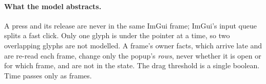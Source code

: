 \documentclass[a4paper,10pt,fleqn]{article}
\begin{document}
\paragraph{What the model abstracts.}
A press and its release are never in the same ImGui frame; ImGui's input queue
splits a fast click.  Only one glyph is under the pointer at a time, so two
overlapping glyphs are not modelled.  A frame's owner facts, which arrive late
and are re-read each frame, change only the popup's \emph{rows}, never whether it
is open or for which frame, and are not in the state.  The drag threshold is a
single boolean.  Time passes only as frames.
\end{document}
